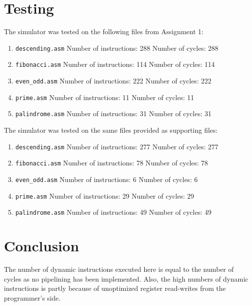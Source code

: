 \documentclass[12pt,a4paper]{article}
\begin{document}
\section{Testing}
The simulator was tested on the following files from Assignment 1:
\begin{enumerate}
    \item \texttt{descending.asm}
        \subitem Number of instructions: 288
        \subitem Number of cycles: 288
    \item \texttt{fibonacci.asm}
        \subitem Number of instructions: 114
        \subitem Number of cycles: 114
    \item \texttt{even\_odd.asm}
        \subitem Number of instructions: 222
        \subitem Number of cycles: 222
    \item \texttt{prime.asm}
        \subitem Number of instructions: 11
        \subitem Number of cycles: 11
    \item \texttt{palindrome.asm}
        \subitem Number of instructions: 31
        \subitem Number of cycles: 31
\end{enumerate}

The simulator was tested on the same files provided as supporting files:
\begin{enumerate}
	\item \texttt{descending.asm}
	\subitem Number of instructions: 277
	\subitem Number of cycles: 277
	\item \texttt{fibonacci.asm}
	\subitem Number of instructions: 78
	\subitem Number of cycles: 78
	\item \texttt{even\_odd.asm}
	\subitem Number of instructions: 6
	\subitem Number of cycles: 6
	\item \texttt{prime.asm}
	\subitem Number of instructions: 29
	\subitem Number of cycles: 29
	\item \texttt{palindrome.asm}
	\subitem Number of instructions: 49
	\subitem Number of cycles: 49
\end{enumerate}

\section{Conclusion}
The number of dynamic instructions executed here is equal to the number of cycles as no pipelining has been implemented.
Also, the high numbers of dynamic instructions is partly because of unoptimized register read-writes from the programmer's side.
\end{document}
